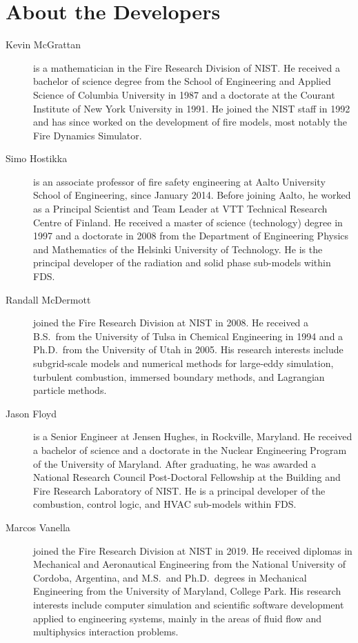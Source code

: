 \chapter{About the Developers}

\begin{description}

\item[Kevin McGrattan] is a mathematician in the Fire Research Division of NIST. He received a bachelor of science degree from the School of Engineering and Applied Science of Columbia University in 1987 and a doctorate at the Courant Institute of New York University in 1991. He joined the NIST staff in 1992 and has since worked on the development of fire models, most notably the Fire Dynamics Simulator.

\item[Simo Hostikka] is an associate professor of fire safety engineering at Aalto University School of Engineering, since January 2014. Before joining Aalto, he worked as a Principal Scientist and Team Leader at VTT Technical Research Centre of Finland. He received a master of science (technology) degree in 1997 and a doctorate in 2008 from the Department of Engineering Physics and Mathematics of the Helsinki University of Technology.  He is the principal developer of the radiation and solid phase sub-models within FDS.

\item[Randall McDermott] joined the Fire Research Division at NIST in 2008. He received a B.S.~from the University of Tulsa in Chemical Engineering in 1994 and a Ph.D.~from the University of Utah in 2005. His research interests include subgrid-scale models and numerical methods for large-eddy simulation, turbulent combustion, immersed boundary methods, and Lagrangian particle methods.

\item[Jason Floyd] is a Senior Engineer at Jensen Hughes, in Rockville, Maryland. He received a bachelor of science and a doctorate in the Nuclear Engineering Program of the University of Maryland. After graduating, he was awarded a National Research Council Post-Doctoral Fellowship at the Building and Fire Research Laboratory of NIST. He is a principal developer of the combustion, control logic, and HVAC sub-models within FDS.

\item[Marcos Vanella] joined the Fire Research Division at NIST in 2019. He received diplomas in Mechanical and Aeronautical Engineering from the National University of Cordoba, Argentina, and M.S.~and Ph.D.~degrees in Mechanical Engineering from the University of Maryland, College Park. His research interests include computer simulation and scientific software development applied to engineering systems, mainly in the areas of fluid flow and multiphysics interaction problems.


\end{description}
